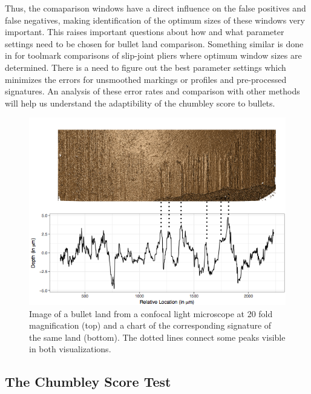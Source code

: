 \documentclass[12pt]{article}
\begin{document}
Thus, the comaparison windows have a direct influence on the false
positives and false negatives, making identification of the optimum
sizes of these windows very important. This raises important questions
about how and what parameter settings need to be chosen for bullet land
comparison. Something similar is done in \citet{afte-chumbley} for
toolmark comparisons of slip-joint pliers where optimum window sizes are
determined. There is a need to figure out the best parameter settings
which minimizes the errors for unsmoothed markings or profiles and
pre-processed signatures. An analysis of these error rates and
comparison with other methods will help us understand the adaptibility
of the chumbley score to bullets.

\begin{figure}
\centering
\includegraphics[width=\textwidth]{images/B6-B2-L6-rescaled.png}


\caption{\label{fig:rgl} Image of a bullet land from a confocal light microscope at 20 fold magnification (top) and a chart of the corresponding signature of the same land (bottom). The dotted lines connect some peaks visible in both visualizations.}

\end{figure}

\subsection{The Chumbley Score Test}\label{the-chumbley-score-test}
\end{document}
